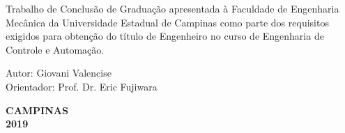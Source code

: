 \vspace*{2cm}
\begin{flushleft}
Trabalho de Conclusão de Graduação apresentada à Faculdade de Engenharia Mecânica da Universidade Estadual de Campinas como parte dos requisitos exigidos para obtenção do título de Engenheiro no curso de Engenharia de Controle e Automação.
\end{flushleft}

\vspace*{0.5cm}



\vspace{0.5cm}
\noindent
Autor: Giovani Valencise\\
Orientador: Prof. Dr. Eric Fujiwara	\\


\vspace{0.6cm}

\vspace{4.0cm}
\begin{center}
\textbf{CAMPINAS}\\ 
\textbf{2019}
\end{center}





